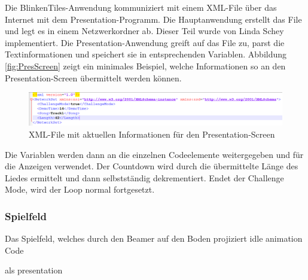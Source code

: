 Die BlinkenTiles-Anwendung kommuniziert mit einem XML-File über das Internet mit dem Presentation-Programm. Die Hauptanwendung erstellt das File und legt es in einem Netzwerkordner ab. Dieser Teil wurde von Linda Schey implementiert. Die Presentation-Anwendung greift auf das File zu, parst die Textinformationen und speichert sie in entsprechenden Variablen. Abbildung \autoref{fig:PresScreen} zeigt ein minimales Beispiel, welche Informationen so an den Presentation-Screen übermittelt werden können.

\begin{figure}[htbp]
	\centering
		\includegraphics[width=1.0\textwidth]{images/XML.png}
	\caption{XML-File mit aktuellen Informationen für den Presentation-Screen }
	\label{fig:PresScreen}
\end{figure}

Die Variablen werden dann an die einzelnen Codeelemente weitergegeben und für die Anzeigen verwendet. Der Countdown wird durch die übermittelte Länge des Liedes ermittelt und dann selbstständig dekrementiert. Endet der Challenge Mode, wird der Loop normal fortgesetzt.

\subsubsection{Spielfeld}
Das Spielfeld, welches durch den Beamer auf den Boden projiziert 
idle animation
Code

als presentation